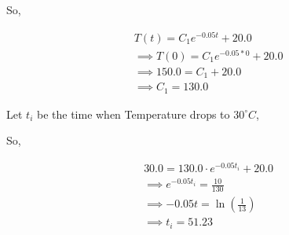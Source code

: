 \documentclass[11pt]{article}
\begin{document}
So,

\begin{align*}
    &T{(t)} = C_{1} e^{- 0.05 t} + 20.0\\
    &\implies T(0) =  C_{1} e^{- 0.05 * 0} + 20.0 \\
    &\implies 150.0 = C_1 + 20.0 \\
    &\implies C_1 = 130.0 
\end{align*}

Let \(t_i\) be the time when Temperature drops to \(30^{\circ}C\),

So,

\begin{align*}
    & 30.0 = 130.0 \cdot e^{- 0.05 t_i} + 20.0\\
    & \implies  e^{- 0.05 t_i} = \frac{10}{130} \\
    & \implies -0.05 t = \ln(\frac{1}{13}) \\
    & \implies t_i = 51.23 
\end{align*}


    
    
    
    
\end{document}
